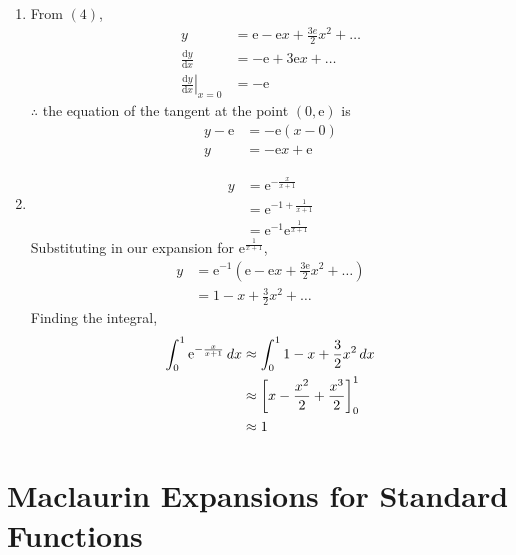 \documentclass[11pt,a4paper]{book}
\begin{document}
\begin{example}
\begin{enumerate}[label=(\alph*)]
\item From $\left(4\right)$,
\begin{align*}
y & =\mathrm{e}-\mathrm{e}x+\frac{3e}{2}x^{2}+\ldots\\
\frac{\mathrm{d}y}{\mathrm{d}x} & =-\mathrm{e}+3\mathrm{e}x+\ldots\\
\left.\frac{\mathrm{d}y}{\mathrm{d}x}\right|_{x=0} & =-\mathrm{e}
\end{align*}
$\therefore$ the equation of the tangent at the point $\left(0,\mathrm{e}\right)$
is
\begin{align*}
y-\mathrm{e} & =-\mathrm{e}\left(x-0\right)\\
y & =-\mathrm{e}x+\mathrm{e}
\end{align*}

\item
\begin{align*}
y & =\mathrm{e}^{-\frac{x}{x+1}}\\
 & =\mathrm{e}^{-1+\frac{1}{x+1}}\\
 & =\mathrm{e}^{-1}\mathrm{e}^{\frac{1}{x+1}}
\end{align*}
Substituting in our expansion for $\mathrm{e}^{\frac{1}{x+1}}$,
\begin{align*}
y & =\mathrm{e}^{-1}\left(\mathrm{e}-\mathrm{e}x+\frac{3\mathrm{e}}{2}x^{2}+\ldots\right)\\
 & =1-x+\frac{3}{2}x^{2}+\ldots
\end{align*}
Finding the integral,
\begin{align*}
\int_{0}^{1}\mathrm{e}^{-\frac{x}{x+1}}\thinspace dx & \approx\int_{0}^{1}1-x+\frac{3}{2}x^{2}\thinspace dx\\
 & \approx\left[x-\frac{x^{2}}{2}+\frac{x^{3}}{2}\right]_{0}^{1}\\
 & \approx1
\end{align*}

\end{enumerate}

\end{example}

\newpage

\section{Maclaurin Expansions for Standard Functions}
\end{document}
